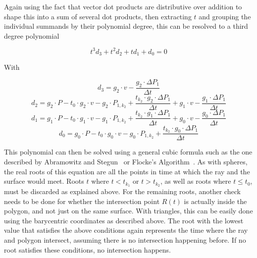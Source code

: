 Again using the fact that vector dot products are distributive over addition to shape this into a sum of several dot products,
then extracting \(t\) and grouping the individual summands by their polynomial degree,
this can be resolved to a third degree polynomial

\begin{equation}\label{SurfacePolyStart}
    t^3d_3 + t^2d_2 + td_1 + d_0 = 0
\end{equation}

With

\begin{equation}
    d_3 = g_2 \cdot v
    - \frac{g_2 \cdot \Delta P_1}{\Delta t}
\end{equation}
\begin{equation}
    d_2 = g_2 \cdot P
    - t_0 \cdot g_2 \cdot v
    - g_2 \cdot P_{1, k_2}
    + \frac{t_{k_2} \cdot g_2 \cdot \Delta P_1}{\Delta t}
    + g_1 \cdot v
    - \frac{g_1 \cdot \Delta P_1}{\Delta t}
\end{equation}
\begin{equation}
    d_1 = g_1 \cdot P
    - t_0 \cdot g_1 \cdot v
    - g_1 \cdot P_{1, k_2}
    + \frac{t_{k_2} \cdot g_1 \cdot \Delta P_1}{\Delta t}
    + g_0 \cdot v
    - \frac{g_0 \cdot \Delta P_1}{\Delta t}
\end{equation}
\begin{equation}\label{SurfacePolyEnd}
    d_0 = g_0 \cdot P
    - t_0 \cdot g_0 \cdot v
    - g_0 \cdot P_{1, k_2}
    + \frac{t_{k_2} \cdot g_0 \cdot \Delta P_1}{\Delta t}
\end{equation}

This polynomial can then be solved using a general cubic formula such as the one described by Abramowitz and Stegun~\cite{AS48}
or Flocke's Algorithm~\cite{Fl15}.
\newline
As with spheres, the real roots of this equation are all the points in time at which the ray and the surface would meet.
Roots \(t\) where \(t < t_{k_1}\) or \(t > t_{k_2}\), as well as roots where \(t \le t_0\),
must be discarded as explained above.
\newline
For the remaining roots, another check needs to be done
for whether the intersection point \(R(t)\) is actually inside the polygon, and not just on the same surface.
With triangles, this can be easily done using the barycentric coordinates as described above.
\newline
The root with the lowest value that satisfies the above conditions again represents the time where the ray and polygon intersect,
assuming there is no intersection happening before. If no root satisfies these conditions, no intersection happens.

